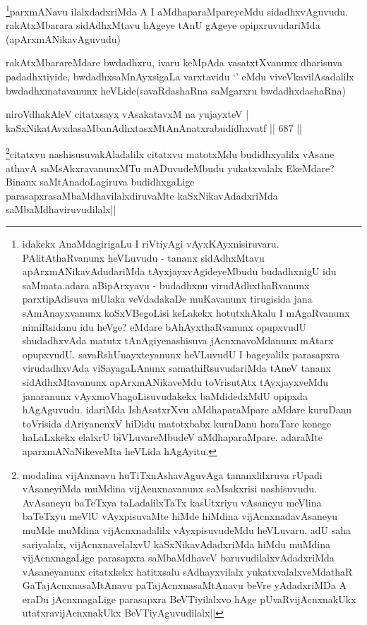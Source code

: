 \begin{artha}
\footnote{idakekx AnaMdagirigaLu I riVtiyAgi vAyxKAyxnisiruvaru. PAlitAthaRvanunx heVLuvudu - tananx sidAdhxMtavu apArxmANikavAdudariMda tAyxjayxvAgideyeMbudu budadhxnigU idu saMmata.adara aBipArxyavu - budadhxnu virudAdhxthaRvanunx parxtipAdisuva mUlaka veVdadakaDe muKavanunx tirugisida jana sAmAnayxvanunx koSxVBegoLisi keLakekx hotutxhAkalu I mAgaRvanunx nimiRsidanu idu heVge? eMdare bAhAyxthaRvanunx opupxvudU shudadhxvAda matutx tAnAgiyenashisuva jAcnxnavoMdanunx mAtarx opupxvudU. savaRshUnayxteyanunx heVLuvudU I bageyalilx parasapxra virudadhxvAda viSayagaLAnunx samathiRsuvudariMda tAneV tananx sidAdhxMtavanunx apArxmANikaveMdu toVrisutAtx tAyxjayxveMdu janaranunx vAyxmoVhagoLisuvudakekx baMdidedxMdU opipxda hAgAguvudu. idariMda IshAsatxrXvu aMdhaparaMpare aMdare kuruDanu toVrisida dAriyanenxV hiDidu matotxbabx kuruDanu horaTare konege haLaLxkekx elalxrU biVLuvareMbudeV aMdhaparaMpare. adaraMte aparxmANaNikeveMta heVLida hAgAyitu.}parxmANavu ilalxdadxriMda A I  aMdhaparaMpareyeMdu sidadhxvAguvudu. rakAtxMbarara sidAdhxMtavu hAgeye tAnU gAgeye opipxruvudariMda (apArxmANikavAguvudu)
\end{artha}

\begin{artha}
rakAtxMbarareMdare bwdadhxru, ivaru keMpAda vasatxtXvanunx dharisuva padadhxtiyide, bwdadhxsaMnAyxsigaLa varxtavidu `\stext' eMdu viveVkavilAsadalilx bwdadhxmatavanunx heVLide(savaRdashaRna saMgarxru bwdadhxdashaRna)
\end{artha}


\begin{shl}
niroVdhakAleV citatxsayx vAsakatavxM na yujayxteV | \\
kaSxNikatAvxdasaMbanAdhxtasxMtAnAnatxrabudidhxvatf \hfill||  687 ||  
\end{shl}

\begin{artha}
\footnote{modalina vijAnxnavu huTiTxnAshavAguvAga tananxlilxruva rUpadi vAsaneyiMda muMdina vijAcnxnavanunx saMsakxrisi nashisuvudu. AvAsaneyu baTeTxya taLadalilxTaTx kasUtxriyu vAsaneyu meVlina baTeTxyu meVlU vAyxpisuvaMte hiMde hiMdina vijAcnxnadavAsaneyu muMde muMdina vijAcnxnadalilx vAyxpisuvudeMdu heVLuvaru. adU saha sariyalalx, vijAcnxnavelalxvU kaSxNikavAdadxriMda hiMdu muMdina vijAcnxnagaLige parasapxra saMbaMdhaveV baruvudilalxvAdadxriMda vAsaneyanunx citatxkekx hatitxsalu sAdhayxvilalx yukatxvalalxveMdathaR GaTajAcnxnasaMtAnavu paTajAcnxnasaMtAnavu beVre yAdadxriMDa A eraDu jAcnxnagaLige parasapxra BeVTiyilalxvo hAge pUvaRvijAcnxnakUkx utatxravijAcnxnakUkx BeVTiyAguvudilalx||}citatxvu nashisusuvakAladalilx citatxvu matotxMdu budidhxyalilx vAsane athavA saMsAkxravanunxMTu mADuvudeMbudu yukatxvalalx EkeMdare? Binanx saMtAnadoLagiruva budidhxgaLige parasapxrasaMbaMdhavilalxdiruvaMte kaSxNikavAdadxriMda saMbaMdhaviruvudilalx||
\end{artha}

